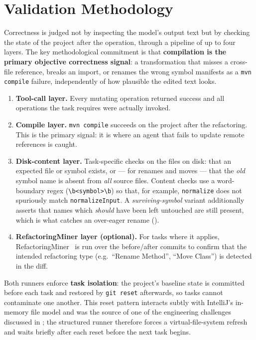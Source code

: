 \section{Validation Methodology}
\label{sec:eval-validation}
Correctness is judged not by inspecting the model's output text but by checking
the state of the project after the operation, through a pipeline of up to four
layers. The key methodological commitment is that \textbf{compilation is the
primary objective correctness signal}: a transformation that misses a cross-file
reference, breaks an import, or renames the wrong symbol manifests as a
\texttt{mvn compile} failure, independently of how plausible the edited text
looks.

\begin{enumerate}
  \item \textbf{Tool-call layer.} Every mutating operation returned success and
    all operations the task requires were actually invoked.
  \item \textbf{Compile layer.} \texttt{mvn compile} succeeds on the project after
    the refactoring. This is the primary signal: it is where an agent that fails
    to update remote references is caught.
  \item \textbf{Disk-content layer.} Task-specific checks on the files on disk:
    that an expected file or symbol exists, or --- for renames and moves --- that
    the \emph{old} symbol name is absent from \emph{all} source files. Content
    checks use a word-boundary regex (\texttt{\textbackslash b<symbol>\textbackslash b})
    so that, for example, \texttt{normalize} does not spuriously match
    \texttt{normalizeInput}. A \emph{surviving-symbol} variant additionally asserts
    that names which \emph{should} have been left untouched are still present,
    which is what catches an over-eager rename ().
  \item \textbf{RefactoringMiner layer (optional).} For tasks where it applies,
    RefactoringMiner~\citep{refactoringminer2025} is run over the before/after
    commits to confirm that the intended refactoring type (e.g.\ ``Rename Method'',
    ``Move Class'') is detected in the diff.
\end{enumerate}

Both runners enforce \textbf{task isolation}: the project's baseline state is
committed before each task and restored by \texttt{git reset} afterwards, so tasks
cannot contaminate one another. This reset pattern interacts subtly with
IntelliJ's in-memory file model and was the source of one of the engineering
challenges discussed in ; the structured runner therefore
forces a virtual-file-system refresh and waits briefly after each reset before
the next task begins.

